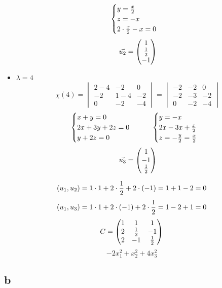 \begin{itemize}
$$    \begin{cases}
    	y = \half[x] \\
        z = -x \\
        2 \cdot \half[x] - x = 0
    \end{cases} $$
    $$ \vec{u_2} =
    \begin{pmatrix}
    	1 \\
        \half \\
        -1
    \end{pmatrix} $$
    \item $ \lambda = 4 $
    $$ \chi(4) =
    \begin{vmatrix}
    	2 - 4 & -2 & 0 \\
        -2 & 1 - 4 & -2 \\
        0 & -2 & -4
    \end{vmatrix} =
    \begin{vmatrix}
    	-2 & -2 & 0 \\
        -2 & -3 & -2 \\
        0 & -2 & -4
    \end{vmatrix} $$
    $$
    \begin{cases}
    	x + y = 0 \\
        2x + 3y + 2z = 0 \\
        y + 2z = 0
    \end{cases} \qquad
    \begin{cases}
        y = -x \\
        2x - 3x + \half[x] \\
        z = -\half[y] = \half[x]
    \end{cases} $$
    $$ \vec{u_3} =
    \begin{pmatrix}
    	1 \\
        -1 \\
        \half
    \end{pmatrix} $$
\end{itemize}

$$ (u_1, u_2) = 1 \cdot 1 + 2 \cdot \half + 2 \cdot (-1) = 1 + 1 - 2 = 0 $$
$$ (u_1, u_3) = 1 \cdot 1 + 2 \cdot (-1) + 2 \cdot \half = 1 - 2 + 1 = 0 $$
$$ C =
\begin{pmatrix}
	1 & 1 & 1 \\
    2 & \half & -1 \\
    2 & -1 & \half
\end{pmatrix} $$
$$ -2x_1^2 + x_2^2 + 4x_3^2 $$

\subsection{b}

